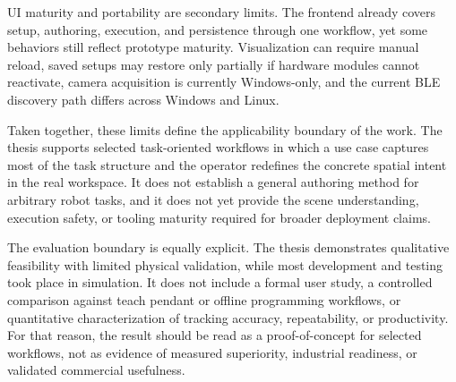 UI maturity and portability are secondary limits. The frontend already covers setup, authoring, execution, and persistence through one workflow, yet some behaviors still reflect prototype maturity. Visualization can require manual reload, saved setups may restore only partially if hardware modules cannot reactivate, camera acquisition is currently Windows-only, and the current BLE discovery path differs across Windows and Linux.

Taken together, these limits define the applicability boundary of the work. The thesis supports selected task-oriented workflows in which a use case captures most of the task structure and the operator redefines the concrete spatial intent in the real workspace. It does not establish a general authoring method for arbitrary robot tasks, and it does not yet provide the scene understanding, execution safety, or tooling maturity required for broader deployment claims.

The evaluation boundary is equally explicit. The thesis demonstrates qualitative feasibility with limited physical validation, while most development and testing took place in simulation. It does not include a formal user study, a controlled comparison against teach pendant or offline programming workflows, or quantitative characterization of tracking accuracy, repeatability, or productivity. For that reason, the result should be read as a proof-of-concept for selected workflows, not as evidence of measured superiority, industrial readiness, or validated commercial usefulness.

